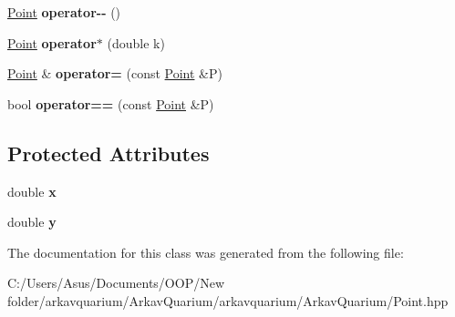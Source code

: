 \begin{DoxyCompactItemize}
\mbox{\label{class_point_af66d56c9c4d0ee0d1905720fecdf967d}} 
\mbox{\hyperlink{class_point}{Point}} {\bfseries operator-\/-\/} ()
\item 
\mbox{\label{class_point_a41db548b441f8b70b613f698a7709dc7}} 
\mbox{\hyperlink{class_point}{Point}} {\bfseries operator$\ast$} (double k)
\item 
\mbox{\label{class_point_a882b38c352ab040f2e283061cbf71498}} 
\mbox{\hyperlink{class_point}{Point}} \& {\bfseries operator=} (const \mbox{\hyperlink{class_point}{Point}} \&P)
\item 
\mbox{\label{class_point_adbfc31a086727d735858faf43734fbed}} 
bool {\bfseries operator==} (const \mbox{\hyperlink{class_point}{Point}} \&P)
\end{DoxyCompactItemize}
\subsection*{Protected Attributes}
\begin{DoxyCompactItemize}
\item 
\mbox{\label{class_point_ab99c56589bc8ad5fa5071387110a5bc7}} 
double {\bfseries x}
\item 
\mbox{\label{class_point_afa38be143ae800e6ad69ce8ed4df62d8}} 
double {\bfseries y}
\end{DoxyCompactItemize}


The documentation for this class was generated from the following file\+:\begin{DoxyCompactItemize}
\item 
C\+:/\+Users/\+Asus/\+Documents/\+O\+O\+P/\+New folder/arkavquarium/\+Arkav\+Quarium/arkavquarium/\+Arkav\+Quarium/Point.\+hpp\end{DoxyCompactItemize}
